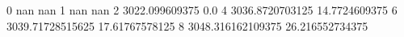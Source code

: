 0 nan nan
1 nan nan
2 3022.099609375 0.0
4 3036.8720703125 14.7724609375
6 3039.71728515625 17.61767578125
8 3048.316162109375 26.216552734375
